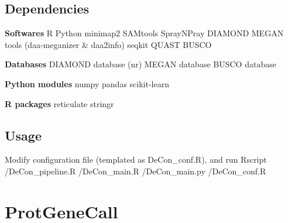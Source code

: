 \documentclass[11pt]{article}
\begin{document}
\begin{sloppypar}
\subsection{Dependencies}
\textbf{Softwares} \newline
R \newline
Python \newline
minimap2 \newline
SAMtools \newline
SprayNPray \newline
DIAMOND \newline
MEGAN tools (daa-meganizer & daa2info) \newline
seqkit \newline
QUAST \newline
BUSCO \newline
\par
\textbf{Databases} \newline
DIAMOND database (nr) \newline
MEGAN database \newline
BUSCO database \newline
\par
\textbf{Python modules} \newline
numpy \newline
pandas \newline
scikit-learn \newline
\par
\textbf{R packages} \newline
reticulate \newline
stringr \newline
\par
\subsection{Usage}
Modify configuration file (templated as DeCon\_conf.R), and run \newline
Rscript /DeCon\_pipeline.R /DeCon\_main.R /DeCon\_main.py /DeCon\_conf.R

\section{ProtGeneCall}

\end{sloppypar}
\end{document}
